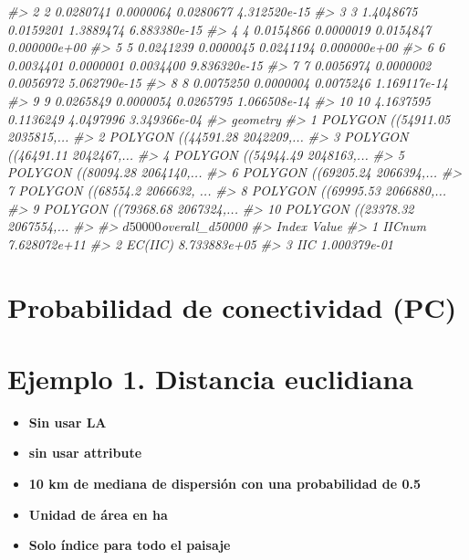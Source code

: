 \documentclass[
]{book}
\newenvironment{Shaded}{\begin{snugshade}}{\end{snugshade}}
\newcommand{\CommentTok}[1]{\textcolor[rgb]{0.56,0.35,0.01}{\textit{#1}}}
\providecommand{\tightlist}{%
  \setlength{\itemsep}{0pt}\setlength{\parskip}{0pt}}
\begin{document}
\begin{Shaded}
\begin{Highlighting}[]
\CommentTok{\#\textgreater{} 2   2 0.0280741 0.0000064 0.0280677  4.312520e{-}15}
\CommentTok{\#\textgreater{} 3   3 1.4048675 0.0159201 1.3889474  6.883380e{-}15}
\CommentTok{\#\textgreater{} 4   4 0.0154866 0.0000019 0.0154847  0.000000e+00}
\CommentTok{\#\textgreater{} 5   5 0.0241239 0.0000045 0.0241194  0.000000e+00}
\CommentTok{\#\textgreater{} 6   6 0.0034401 0.0000001 0.0034400  9.836320e{-}15}
\CommentTok{\#\textgreater{} 7   7 0.0056974 0.0000002 0.0056972  5.062790e{-}15}
\CommentTok{\#\textgreater{} 8   8 0.0075250 0.0000004 0.0075246  1.169117e{-}14}
\CommentTok{\#\textgreater{} 9   9 0.0265849 0.0000054 0.0265795  1.066508e{-}14}
\CommentTok{\#\textgreater{} 10 10 4.1637595 0.1136249 4.0497996  3.349366e{-}04}
\CommentTok{\#\textgreater{}                          geometry}
\CommentTok{\#\textgreater{} 1  POLYGON ((54911.05 2035815,...}
\CommentTok{\#\textgreater{} 2  POLYGON ((44591.28 2042209,...}
\CommentTok{\#\textgreater{} 3  POLYGON ((46491.11 2042467,...}
\CommentTok{\#\textgreater{} 4  POLYGON ((54944.49 2048163,...}
\CommentTok{\#\textgreater{} 5  POLYGON ((80094.28 2064140,...}
\CommentTok{\#\textgreater{} 6  POLYGON ((69205.24 2066394,...}
\CommentTok{\#\textgreater{} 7  POLYGON ((68554.2 2066632, ...}
\CommentTok{\#\textgreater{} 8  POLYGON ((69995.53 2066880,...}
\CommentTok{\#\textgreater{} 9  POLYGON ((79368.68 2067324,...}
\CommentTok{\#\textgreater{} 10 POLYGON ((23378.32 2067554,...}
\CommentTok{\#\textgreater{} }
\CommentTok{\#\textgreater{} $d50000$overall\_d50000}
\CommentTok{\#\textgreater{}     Index        Value}
\CommentTok{\#\textgreater{} 1  IICnum 7.628072e+11}
\CommentTok{\#\textgreater{} 2 EC(IIC) 8.733883e+05}
\CommentTok{\#\textgreater{} 3     IIC 1.000379e{-}01}
\end{Highlighting}
\end{Shaded}

\section{Probabilidad de conectividad (PC)}\label{probabilidad-de-conectividad-pc}

\section{Ejemplo 1. Distancia euclidiana}\label{ejemplo-1.-distancia-euclidiana-1}

\begin{itemize}
\tightlist
\item
  \textbf{Sin usar LA}
\item
  \textbf{sin usar attribute}
\item
  \textbf{10 km de mediana de dispersión con una probabilidad de 0.5}
\item
  \textbf{Unidad de área en ha}
\item
  \textbf{Solo índice para todo el paisaje}
\end{itemize}
\end{document}
